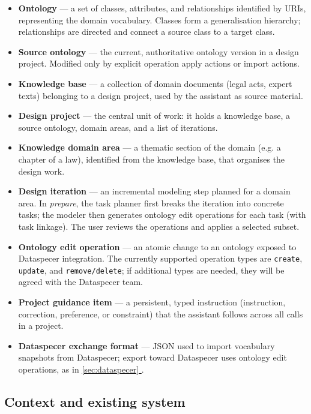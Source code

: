 \documentclass{article}
\newcommand*{\fullref}[1]{\hyperref[{#1}]{\ref*{#1} \nameref*{#1}}}
\begin{document}
\begin{itemize}
  \item \textbf{Ontology} --- a set of classes, attributes, and relationships identified by URIs, representing the domain vocabulary. Classes form a generalisation hierarchy; relationships are directed and connect a source class to a target class.
  \item \textbf{Source ontology} --- the current, authoritative ontology version in a design project. Modified only by explicit operation apply actions or import actions.
  \item \textbf{Knowledge base} --- a collection of domain documents (legal acts, expert texts) belonging to a design project, used by the assistant as source material.
  \item \textbf{Design project} --- the central unit of work: it holds a knowledge base, a source ontology, domain areas, and a list of iterations.
  \item \textbf{Knowledge domain area} --- a thematic section of the domain (e.g. a chapter of a law), identified from the knowledge base, that organises the design work.
  \item \textbf{Design iteration} --- an incremental modeling step planned for a domain area. In \emph{prepare}, the task planner first breaks the iteration into concrete tasks; the modeler then generates ontology edit operations for each task (with task linkage). The user reviews the operations and applies a selected subset.
  \item \textbf{Ontology edit operation} --- an atomic change to an ontology exposed to Dataspecer integration. The currently supported operation types are \texttt{create}, \texttt{update}, and \texttt{remove/delete}; if additional types are needed, they will be agreed with the Dataspecer team.
  \item \textbf{Project guidance item} --- a persistent, typed instruction (instruction, correction, preference, or constraint) that the assistant follows across all calls in a project.
  \item \textbf{Dataspecer exchange format} --- JSON used to import vocabulary snapshots from Dataspecer; export toward Dataspecer uses ontology edit operations, as in \fullref{sec:dataspecer}.
\end{itemize}

\subsection{Context and existing system}
\end{document}
